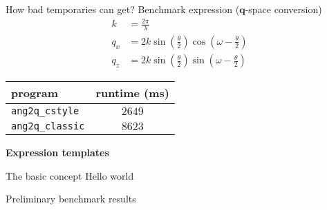 \documentclass{beamer}
\begin{document}
\begin{frame}[fragile]{How bad temporaries can get?}
    Benchmark expression ($\mathbf{q}$-space conversion)
    \begin{align}
    k &= \frac{2\pi}{\lambda} \nonumber \\
        q_x &= 2k\sin\left(\frac{\theta}{2}\right)\cos\left(\omega-\frac{\theta}{2}\right)
        \nonumber \\
        q_z &= 2k\sin\left(\frac{\theta}{2}\right)\sin\left(\omega-\frac{\theta}{2}\right)
        \nonumber
    \end{align}

    \vspace{0.05\textheight}
    \begin{center}
        \begin{tabular}{lc}
            \hline
            program & runtime (ms) \\
            \hline\hline
            \texttt{ang2q\_cstyle} & $2649$ \\
            \texttt{ang2q\_classic} & $8623$  \\
            \hline
        \end{tabular}
    \end{center}

\end{frame}

\begin{frame}[plain]
    \begin{center}
        \huge\textbf{Expression templates}
    \end{center}
\end{frame}

\begin{frame}[fragile]{The basic concept}
Hello world
\end{frame}

\begin{frame}[fragile]{Preliminary benchmark results}
\end{frame}

\end{document}
